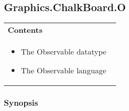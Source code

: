 \subsection{Graphics.ChalkBoard.O}     

  

 

 
\begin{tabular}{p{0.95\linewidth}}{\bf {\bf Contents}}\\ %

 
\begin{itemize}
\setlength{\itemsep}{0in}

\item The Observable datatype
\item The Observable language
\end{itemize}
\\ %


\end{tabular}


 

 

\subsubsection{Synopsis}

 

